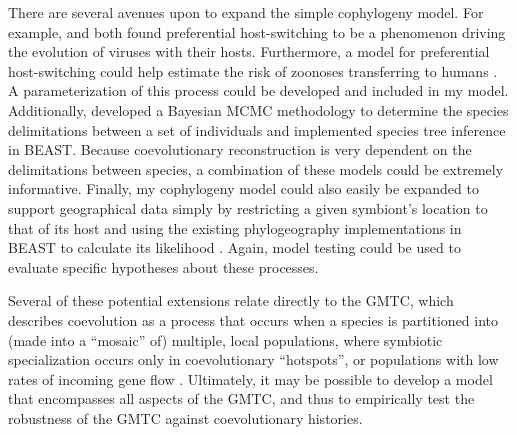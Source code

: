 \documentclass[12pt,letterpaper]{article}
\begin{document}
There are several avenues upon to expand the simple cophylogeny model. For example, \textcite{Charleston:2002} and \textcite{Faria:2013} both found preferential host-switching to be a phenomenon driving the evolution of viruses with their hosts. Furthermore, a model for preferential host-switching could help estimate the risk of zoonoses transferring to humans \parencite{Charleston:2009}. A parameterization of this process could be developed and included in my model. Additionally, \textcite{Yang:2010} developed a Bayesian \ac{MCMC} methodology to determine the species delimitations between a set of individuals and \textcite{Heled:2010a} implemented species tree inference in BEAST. Because coevolutionary reconstruction is very dependent on the delimitations between species, a combination of these models could be extremely informative. Finally, my cophylogeny model could also easily be expanded to support geographical data simply by restricting a given symbiont's location to that of its host and using the existing phylogeography implementations in BEAST to calculate its likelihood \parencites{Lemey:2009}{Lemey:2010}. Again, model testing could be used to evaluate specific hypotheses about these processes.

Several of these potential extensions relate directly to the \ac{GMTC}, which describes coevolution as a process that occurs when a species is partitioned into (made into a \enquote{mosaic} of) multiple, local populations, where symbiotic specialization occurs only in coevolutionary \enquote{hotspots}, or populations with low rates of incoming gene flow \parencite{Thompson:2005}. Ultimately, it may be possible to develop a model that encompasses all aspects of the \ac{GMTC}, and thus to empirically test the robustness of the \ac{GMTC} against coevolutionary histories.

\setlength\bibitemsep{12pt}
\singlespacing
\printbibliography
\end{document}
